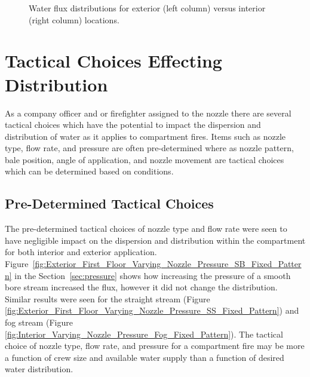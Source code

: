 \documentclass[12pt,oneside]{book}
\begin{document}
\begin{figure}[!ht]
\centering
{}
\caption[Interior vs Exterior Application]{Water flux distributions for exterior (left column) versus interior (right column) locations.}
\label{fig:Interior_vs_Exterior}
\end{figure}

\section{Tactical Choices Effecting Distribution}

As a company officer and or firefighter assigned to the nozzle there are several tactical choices which have the potential to impact the dispersion and distribution of water as it applies to compartment fires. Items such as nozzle type, flow rate, and pressure are often pre-determined where as nozzle pattern, bale position, angle of application, and nozzle movement are tactical choices which can be determined based on conditions.  

\subsection{Pre-Determined Tactical Choices}
The pre-determined tactical choices of nozzle type and flow rate were seen to have negligible impact on the dispersion and distribution within the compartment for both interior and exterior application. Figure~\ref{fig:Exterior_First_Floor_Varying_Nozzle_Pressure_SB_Fixed_Pattern} in the Section~\ref{sec:pressure} shows how increasing the pressure of a smooth bore stream increased the flux, however it did not change the distribution. Similar results were seen for the straight stream (Figure \ref{fig:Exterior_First_Floor_Varying_Nozzle_Pressure_SS_Fixed_Pattern}) and fog stream (Figure \ref{fig:Interior_Varying_Nozzle_Pressure_Fog_Fixed_Pattern}). The tactical choice of nozzle type, flow rate, and pressure for a compartment fire may be more a function of crew size and available water supply than a function of desired water distribution. 
\end{document}
